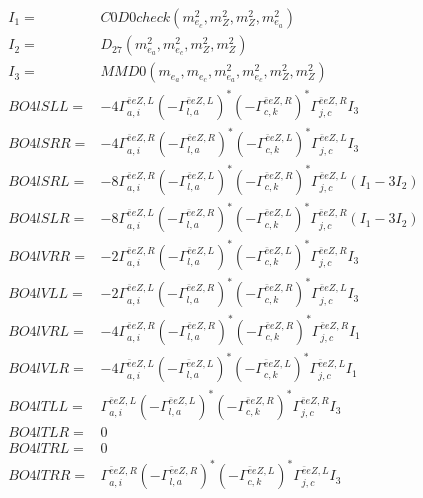 \documentclass[A4,landscape]{article}
\begin{document}
\begin{align} 
I_1 = & C0D0check(m^2_{e_{{c}}}, m^2_{Z}, m^2_{Z}, m^2_{e_{{a}}}) \\ 
I_2 = & D_{27}(m^2_{e_{{a}}}, m^2_{e_{{c}}}, m^2_{Z}, m^2_{Z}) \\ 
I_3 = & MMD0(m_{e_{{a}}}, m_{e_{{c}}}, m^2_{e_{{a}}}, m^2_{e_{{c}}}, m^2_{Z}, m^2_{Z}) \\ 
  BO4lSLL= & -4  \Gamma^{\bar{e}e Z ,L}_{a, i} (- \Gamma^{\bar{e}e Z ,L} _{l, a})^* (- \Gamma^{\bar{e}e Z ,R} _{c, k})^* \Gamma^{\bar{e}e Z ,R}_{j, c} I_3 \\ 
  BO4lSRR= & -4  \Gamma^{\bar{e}e Z ,R}_{a, i} (- \Gamma^{\bar{e}e Z ,R} _{l, a})^* (- \Gamma^{\bar{e}e Z ,L} _{c, k})^* \Gamma^{\bar{e}e Z ,L}_{j, c} I_3 \\ 
  BO4lSRL= & -8  \Gamma^{\bar{e}e Z ,R}_{a, i} (- \Gamma^{\bar{e}e Z ,L} _{l, a})^* (- \Gamma^{\bar{e}e Z ,R} _{c, k})^* \Gamma^{\bar{e}e Z ,L}_{j, c} (I_1 - 3 I_2) \\ 
  BO4lSLR= & -8  \Gamma^{\bar{e}e Z ,L}_{a, i} (- \Gamma^{\bar{e}e Z ,R} _{l, a})^* (- \Gamma^{\bar{e}e Z ,L} _{c, k})^* \Gamma^{\bar{e}e Z ,R}_{j, c} (I_1 - 3 I_2) \\ 
  BO4lVRR= & -2  \Gamma^{\bar{e}e Z ,R}_{a, i} (- \Gamma^{\bar{e}e Z ,L} _{l, a})^* (- \Gamma^{\bar{e}e Z ,L} _{c, k})^* \Gamma^{\bar{e}e Z ,R}_{j, c} I_3 \\ 
  BO4lVLL= & -2  \Gamma^{\bar{e}e Z ,L}_{a, i} (- \Gamma^{\bar{e}e Z ,R} _{l, a})^* (- \Gamma^{\bar{e}e Z ,R} _{c, k})^* \Gamma^{\bar{e}e Z ,L}_{j, c} I_3 \\ 
  BO4lVRL= & -4  \Gamma^{\bar{e}e Z ,R}_{a, i} (- \Gamma^{\bar{e}e Z ,R} _{l, a})^* (- \Gamma^{\bar{e}e Z ,R} _{c, k})^* \Gamma^{\bar{e}e Z ,R}_{j, c} I_1 \\ 
  BO4lVLR= & -4  \Gamma^{\bar{e}e Z ,L}_{a, i} (- \Gamma^{\bar{e}e Z ,L} _{l, a})^* (- \Gamma^{\bar{e}e Z ,L} _{c, k})^* \Gamma^{\bar{e}e Z ,L}_{j, c} I_1 \\ 
  BO4lTLL= &  \Gamma^{\bar{e}e Z ,L}_{a, i} (- \Gamma^{\bar{e}e Z ,L} _{l, a})^* (- \Gamma^{\bar{e}e Z ,R} _{c, k})^* \Gamma^{\bar{e}e Z ,R}_{j, c} I_3 \\ 
  BO4lTLR= & 0 \\ 
  BO4lTRL= & 0 \\ 
  BO4lTRR= &  \Gamma^{\bar{e}e Z ,R}_{a, i} (- \Gamma^{\bar{e}e Z ,R} _{l, a})^* (- \Gamma^{\bar{e}e Z ,L} _{c, k})^* \Gamma^{\bar{e}e Z ,L}_{j, c} I_3 \\ 
\end{align} 
\end{document}

